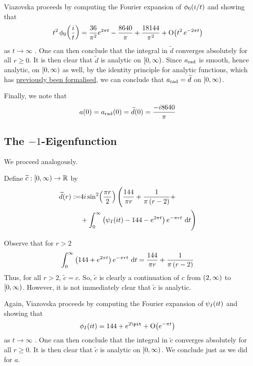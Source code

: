 Viazovska proceeds by computing the Fourier expansion of $\phi_0\!\left( i/t \right)$ and showing that
\begin{align*}
    t^2 \, \phi_0\!\left( \frac{i}{t} \right) =
    \frac{36}{\pi^2}e^{2\pi t} - \frac{8640}{\pi} + \frac{18144}{\pi^2} + \operatorname{O}\!\left( t^2 \, e^{-2 \pi t} \right)
\end{align*}
as $t \to \infty$ \cite[(39)]{Viazovska8}. One can then conclude that the integral in $\tilde{d}$ converges absolutely for all $r \geq 0$. It is then clear that $\tilde{d}$ is analytic on $\left[0, \infty\right)$. Since $a_{\operatorname{rad}}$ is smooth, hence analytic, on $\left[0, \infty\right)$ as well, by the identity principle for analytic functions, which has \href{https://github.com/leanprover-community/mathlib4/blob/6c6e0180f0d3dc9f47f85532f48d268d8656789a/Mathlib/Analysis/Analytic/Uniqueness.lean#L217-L226}{previously been formalised}, we can conclude that $a_{\operatorname{rad}} = \widetilde{d}$ on $\left[0, \infty\right)$.

Finally, we note that
\begin{align*}
    a\!\left( 0 \right) = a_{\operatorname{rad}}\!\left( 0 \right) = \widetilde{d}\!\left( 0 \right) = \frac{-i 8640}{\pi}
\end{align*}

\subsection{The $-1$-Eigenfunction}

We proceed analogously.

\begin{boxdefinition}
    Define $\widetilde{c} : \left[0, \infty\right) \to \mathbb{R}$ by
    \begin{align*}
        \widetilde{d}(r) :=&
        4i \sin^2\!\left( \frac{\pi r}{2} \right) \Bigg(
        \frac{144}{\pi r} + \frac{1}{\pi\left( r - 2 \right)} + \\
        &+\int_{0}^{\infty} \left( \psi_I\!\left( it \right) - 144 - e^{2 \pi t} \right) e^{-\pi r t} \, \operatorname{d}\!{t}\Bigg)
    \end{align*}
\end{boxdefinition}

Observe that for $r > 2$
\begin{align*}
    \int_{0}^{\infty} \left( 144 + e^{2 \pi t} \right) e^{-\pi r t} \, \operatorname{d}\!{t}
    = \frac{144}{\pi r} + \frac{1}{\pi\left( r - 2 \right)}
\end{align*}
Thus, for all $r > 2$, $\tilde{c} = c$. So, $\tilde{c}$ is clearly a continuation of $c$ from $\left( 2, \infty \right)$ to $\left[0, \infty\right)$. However, it is not immediately clear that $\tilde{c}$ is analytic.

Again, Viazovska proceeds by computing the Fourier expansion of $\psi_I\!\left( it \right)$ and showing that
\begin{align*}
    \phi_I\of{it} =
    144 + e^{2\pit} + \BigO{e^{- \pi t}}
\end{align*}
as $t \to \infty$ \cite[(39)]{Viazovska8}. One can then conclude that the integral in $\tilde{c}$ converges absolutely for all $r \geq 0$. It is then clear that $\tilde{c}$ is analytic on $\left[0, \infty\right)$. We conclude just as we did for $a$.

